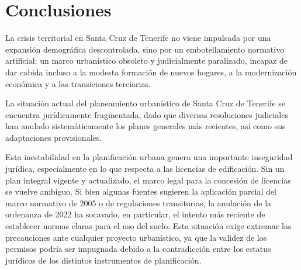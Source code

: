 \section{Conclusiones}
La crisis territorial en Santa Cruz de Tenerife no viene impulsada por una expansión demográfica descontrolada, sino por un embotellamiento normativo artificial:
un marco urbanístico obsoleto y judicialmente paralizado,
incapaz de dar cabida incluso a la modesta formación de nuevos hogares, a la modernización económica y a las transiciones terciarias.

La situación actual del planeamiento urbanístico de Santa Cruz de Tenerife se encuentra jurídicamente fragmentada,
dado que diversas resoluciones judiciales han anulado sistemáticamente los planes generales más recientes, así como sus adaptaciones provisionales.

Esta inestabilidad en la planificación urbana genera una importante inseguridad jurídica, especialmente en lo que respecta a las licencias de edificación.
Sin un plan integral vigente y actualizado, el marco legal para la concesión de licencias se vuelve ambiguo.
Si bien algunas fuentes sugieren la aplicación parcial del marco normativo de 2005 o de regulaciones transitorias,
la anulación de la ordenanza de 2022 ha socavado, en particular, el intento más reciente de establecer normas claras para el uso del suelo. Esta situación exige extremar las precauciones ante cualquier proyecto urbanístico, ya que la validez de los permisos podría ser impugnada debido a la contradicción entre los estatus jurídicos de los distintos instrumentos de planificación.
